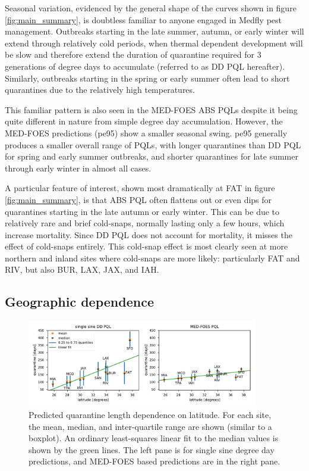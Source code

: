 \documentclass[10pt,a4paper,twocolumn]{article}
\begin{document}
Seasonal variation, evidenced by the general shape of the curves shown in figure \ref{fig:main_summary}, 
is doubtless familiar to anyone engaged in Medfly pest management.
Outbreaks starting in the late summer, autumn, or early winter will extend through relatively cold periods,
when thermal dependent development will be slow and therefore extend the duration of quarantine required
for 3 generations of degree days to accumulate (referred to as DD PQL hereafter).
Similarly, outbreaks starting in the spring or early summer often lead to short quarantines due
to the relatively high temperatures.

This familiar pattern is also seen in the MED-FOES ABS PQLs despite it being 
quite different in nature from simple degree day accumulation.
However, the MED-FOES predictions (pe95) show a smaller seasonal swing.
pe95 generally produces a smaller overall range of PQLs,
with longer quarantines than DD PQL for spring and early summer outbreaks,
and shorter quarantines for late summer through early winter in almost all cases.

A particular feature of interest, shown most dramatically at FAT in figure \ref{fig:main_summary},
is that ABS PQL often flattens out or even dips for quarantines starting in the late 
autumn or early winter.  This can be due to relatively rare and brief cold-snaps,
normally lasting only a few hours, which increase mortality.
Since DD PQL does not account for mortality, it misses the effect of cold-snaps entirely.
This cold-snap effect is most clearly seen at more northern and 
inland sites where cold-snaps are more likely: 
particularly FAT and RIV, but also BUR, LAX, JAX, and IAH.

\subsection*{Geographic dependence}

\begin{figure}[ht!]
\centering
\includegraphics[width=0.9\textwidth]{figs/fig_latitude_trend_withSFO.pdf}
\caption{\label{fig:latitude_trend} Predicted quarantine length dependence on latitude.
For each site, the mean, median, and inter-quartile range are shown (similar to a boxplot).
An ordinary least-squares linear fit to the median values is shown by the green lines.
The left pane is for single sine degree day predictions,
and MED-FOES based predictions are in the right pane.
}
\end{figure}
\end{document}
